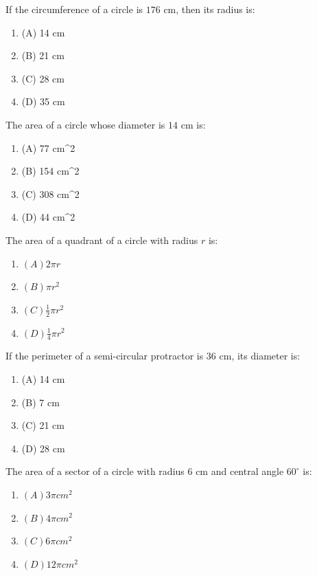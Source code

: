 \documentclass[12pt,a4paper]{exam}
\begin{document}
\begin{questions}
\question[1] If the circumference of a circle is $176\text{ cm}$, then its radius is:
\begin{enumerate}[label=(\Alph*)]
  \item (A) 14 cm
  \item (B) 21 cm
  \item (C) 28 cm
  \item (D) 35 cm
\end{enumerate}
\vspace{0.15cm}

\question[1] The area of a circle whose diameter is $14\text{ cm}$ is:
\begin{enumerate}[label=(\Alph*)]
  \item (A) 77 cm\textasciicircum{}2
  \item (B) 154 cm\textasciicircum{}2
  \item (C) 308 cm\textasciicircum{}2
  \item (D) 44 cm\textasciicircum{}2
\end{enumerate}
\vspace{0.15cm}

\question[1] The area of a quadrant of a circle with radius $r$ is:
\begin{enumerate}[label=(\Alph*)]
  \item $(A) 2\pi r$
  \item $(B) \pi r^2$
  \item $(C) \frac{1}{2} \pi r^2$
  \item $(D) \frac{1}{4} \pi r^2$
\end{enumerate}
\vspace{0.15cm}

\question[1] If the perimeter of a semi-circular protractor is $36\text{ cm}$, its diameter is:
\begin{enumerate}[label=(\Alph*)]
  \item (A) 14 cm
  \item (B) 7 cm
  \item (C) 21 cm
  \item (D) 28 cm
\end{enumerate}
\vspace{0.15cm}

\question[1] The area of a sector of a circle with radius $6\text{ cm}$ and central angle $60^\circ$ is:
\begin{enumerate}[label=(\Alph*)]
  \item $(A) 3\pi cm^2$
  \item $(B) 4\pi cm^2$
  \item $(C) 6\pi cm^2$
  \item $(D) 12\pi cm^2$
\end{enumerate}
\vspace{0.15cm}


\end{questions}
\end{document}
